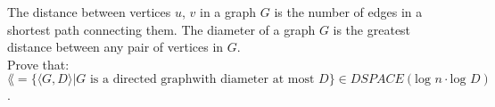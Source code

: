 The distance between vertices $u$, $v$ in a graph $G$ is the number of edges in a
shortest path connecting them. The diameter of a graph $G$ is the greatest
distance between any pair of vertices in $G$. \\
Prove that: \\
$\lang = \{\langle G, D \rangle | G \text{ is a directed graphwith diameter at most } D \}
    \in DSPACE(\text{log }n \cdot \text{log }D)$.
